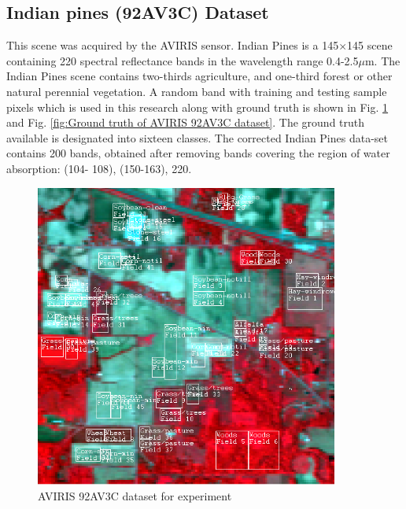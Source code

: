 \documentclass[document.tex]{subfiles}
\begin{document}
\subsection{Indian pines (92AV3C) Dataset}
\noindent This scene was acquired by the AVIRIS sensor. Indian Pines is a 145$\times$145 scene containing
220 spectral reflectance bands in the wavelength range 0.4-2.5$\mu$m. The Indian Pines scene
contains two-thirds agriculture, and one-third forest or other natural perennial vegetation.
A random band with training and testing sample pixels which is used in this research along with ground truth is shown in Fig. \ref{fig:AVIRIS 92AV3C dataset for experiment} and Fig. \ref{fig:Ground truth of AVIRIS 92AV3C dataset}. The ground truth
available is designated into sixteen classes. The corrected Indian Pines data-set contains
200 bands, obtained after removing bands covering the region of water absorption: (104-
108), (150-163), 220.
\begin{figure}[H]
	\begin{center}
		\includegraphics[height=10.0cm]{imgs/Dataset.png}
	\end{center}
	\caption{AVIRIS 92AV3C dataset for experiment}
	\label{fig:AVIRIS 92AV3C dataset for experiment}
\end{figure}
\end{document}
